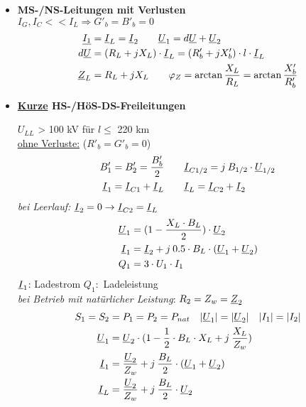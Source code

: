 \begin{itemize}
\newpage
\item[] \textbf{MS-/NS-Leitungen mit Verlusten}\\
    $I_G, I_C<< I_L \Rightarrow G'_b = B'_b = 0$
        \begin{align*}
            \underline{I_1} &= \underline{I}_L = \underline{I}_2 \qquad
            \underline{U}_1 = d \underline{U} + \underline{U}_2\\
            d \underline{U} &= (R_L + jX_L) \cdot \underline{I}_L = (R'_b +jX'_b) \cdot l \cdot \underline{I}_L\\
            \underline{Z}_L &= R_L +jX_L \qquad \varphi_Z =\arctan \frac{X_L}{R_L} = \arctan \frac{X'_b}{R'_b}
        \end{align*}

\item[] \textbf{\ul{Kurze} HS-/HöS-DS-Freileitungen}

    $U_{LL}$ > 100 kV für $l\leq$ 220 km\\

    \ul{ohne Verluste:} ($R'_b = G'_b = 0$)
    \begin{align*}
        B'_1 &= B'_2 = \frac{B'_b}{2} \qquad
        \underline{I}_{C1/2} = j \: B_{1/2} \cdot \underline{U}_{1/2}\\
        \underline{I}_1 &= \underline{I}_{C1} + \underline{I}_L \qquad  \underline{I}_L =  \underline{I}_{C2} +  \underline{I}_2
    \end{align*}
    \textit{bei Leerlauf:} $\underline{I}_2 = 0 \rightarrow \underline{I}_{C2} = \underline{I}_L$
    \begin{align*}
        \underline{U}_1 &= (1 - \frac{X_L\cdot B_L}{2}) \cdot \underline{U}_2\\
        \underline{I}_1 &=  \underline{I}_2 + j \: 0.5 \cdot B_L \cdot ( \underline{U}_1 + \underline{U}_2)\\
        Q_1 &= 3\cdot U_1 \cdot I_1
    \end{align*}
    $\underline{I}_1$: Ladestrom \qquad
    $Q_1:$ Ladeleistung\\

    \textit{bei Betrieb mit natürlicher Leistung}: $R_2 = Z_w = \underline{Z}_2$
        \begin{align*}
            S_1 = S_2 &= P_1 = P_2 = P_{nat} \quad
            |\underline{U}_1| = |\underline{U}_2| \quad |I_1| = |I_2|\\
            \underline{U}_1 &= \underline{U}_2 \cdot(1-\frac{1}{2} \cdot B_L \cdot X_L + j\: \frac{X_L}{Z_w})\\
            \underline{I}_1 &= \frac{\underline{U}_2}{Z_w}+j\: \frac{B_L}{2}\cdot (\underline{U}_1 + \underline{U}_2)\\
            \underline{I}_L &= \frac{\underline{U}_2}{Z_w}+j\: \frac{B_L}{2}\cdot \underline{U}_2\\
        \end{align*}


\end{itemize}

